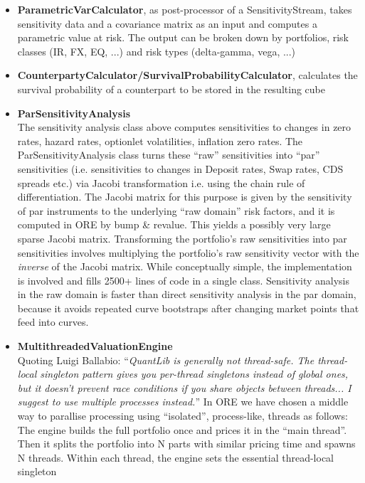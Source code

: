 \documentclass[12pt, a4paper]{report}
\begin{document}
\begin{itemize}
\begin{itemize}
\end{itemize}
\item {\bf ParametricVarCalculator}, as post-processor of a SensitivityStream, takes sensitivity data
  and a covariance matrix as an input and computes a parametric value at risk. The output can be
  broken down by portfolios, risk classes (IR, FX, EQ, ...) and risk types (delta-gamma, vega, ...)
\item {\bf CounterpartyCalculator/SurvivalProbabilityCalculator}, calculates the survival probability
  of a counterpart to be stored in the resulting cube
\item {\bf ParSensitivityAnalysis} \\ 
  The sensitivity analysis class above computes sensitivities to changes in zero rates, hazard rates,
  optionlet volatilities, inflation zero rates. The ParSensitivityAnalysis class turns these ``raw''
  sensitivities into ``par'' sensitivities (i.e. sensitivities to changes in Deposit rates, Swap
  rates, CDS spreads etc.) via Jacobi transformation i.e. using the chain rule of differentiation.
  The Jacobi matrix for this purpose is given by the sensitivity of par instruments to the underlying
  ``raw domain'' risk factors, and it is computed in ORE by bump \& revalue.
  This yields a possibly very large sparse Jacobi matrix. Transforming the portfolio's
  raw sensitivities into par sensitivities involves multiplying the portfolio's raw sensitivity vector
  with the {\em inverse} of the Jacobi matrix. While conceptually simple, the implementation is
  involved and fills 2500+ lines of code in a single class.  Sensitivity analysis in the raw domain is
  faster than direct sensitivity analysis in the par domain, because it avoids repeated curve
  bootstraps after changing market points that feed into curves.
\item {\bf MultithreadedValuationEngine} \\
  Quoting Luigi Ballabio: ``{\em QuantLib is generally not
  thread-safe. The thread-local singleton pattern gives you per-thread singletons instead of global
  ones, but it doesn't prevent race conditions if you share objects between threads... I suggest to
  use multiple processes instead.}'' In ORE we have chosen a middle way to parallise processing using
  ``isolated'', process-like, threads as follows: The engine builds the full portfolio once and
  prices it in the ``main thread''.
  Then it splits the portfolio into N parts with similar pricing time and spawns
  N threads. Within each thread, the engine sets the essential thread-local singleton

\end{itemize}
\end{document}
